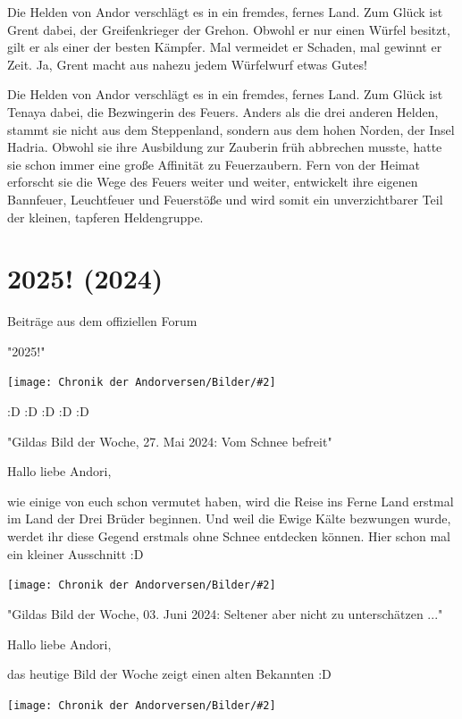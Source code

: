 \documentclass[10pt, a4paper, oneside]{book}
\newcommand{\fillbreak}{\vspace*{\fill}\columnbreak}
\newcommand{\storytext}[1]{%
    \section{#1}%
    \label{Storytext: #1}%
}
\newcommand{\bildmitts}[2][height=0.32\textwidth,width=0.48\textwidth,keepaspectratio]{%
    \begin{center}
        \texttt{[image: Chronik der Andorversen/Bilder/\#2]}
    \end{center}
}
\begin{document}
\begin{multicols}{2}
Die Helden von Andor verschlägt es in ein fremdes, fernes Land. Zum Glück ist Grent dabei, der Greifenkrieger der Grehon. Obwohl er nur einen Würfel besitzt, gilt er als einer der besten Kämpfer. Mal vermeidet er Schaden, mal gewinnt er Zeit. Ja, Grent macht aus nahezu jedem Würfelwurf etwas Gutes!\bigskip

Die Helden von Andor verschlägt es in ein fremdes, fernes Land. Zum Glück ist Tenaya dabei, die Bezwingerin des Feuers. Anders als die drei anderen Helden, stammt sie nicht aus dem Steppenland, sondern aus dem hohen Norden, der Insel Hadria. Obwohl sie ihre Ausbildung zur Zauberin früh abbrechen musste, hatte sie schon immer eine große Affinität zu Feuerzaubern. Fern von der Heimat erforscht sie die Wege des Feuers weiter und weiter, entwickelt ihre eigenen Bannfeuer, Leuchtfeuer und Feuerstöße und wird somit ein unverzichtbarer Teil der kleinen, tapferen Heldengruppe.




\fillbreak
\storytext{2025! (2024)}




\begin{center}
    Beiträge aus dem offiziellen Forum

    "2025!"
\end{center}

\bildmitts{2025! 1.jpeg}

:D :D :D :D :D


\begin{center}
    "Gildas Bild der Woche, 27. Mai 2024: Vom Schnee befreit"
\end{center}

Hallo liebe Andori,

wie einige von euch schon vermutet haben, wird die Reise ins Ferne Land erstmal im Land der Drei Brüder beginnen. Und weil die Ewige Kälte bezwungen wurde, werdet ihr diese Gegend erstmals ohne Schnee entdecken können. Hier schon mal ein kleiner Ausschnitt :D

\bildmitts{2025! 2.jpeg}




\begin{center}
    "Gildas Bild der Woche, 03. Juni 2024: Seltener aber nicht zu unterschätzen ..."
\end{center}

Hallo liebe Andori,

das heutige Bild der Woche zeigt einen alten Bekannten :D

\bildmitts{2025! 3.jpeg}


\end{multicols}
\end{document}
